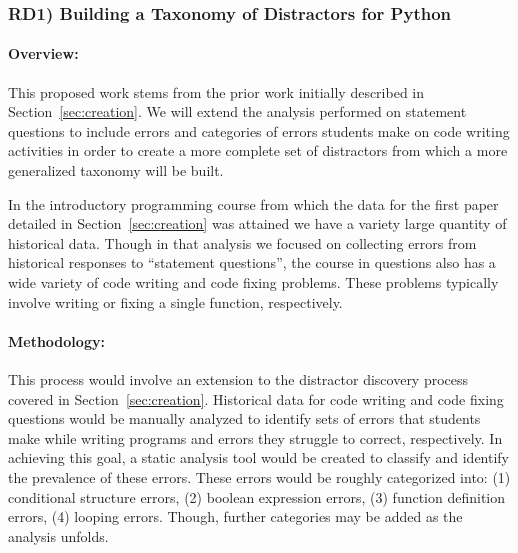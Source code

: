 \documentclass[authorversion,nonacm]{acmart}
\begin{document}
\subsubsection{RD1) Building a Taxonomy of Distractors for Python}\label{sec:taxonomy}

\paragraph{Overview:} 

This proposed work stems from the prior work initially described in
Section~\ref{sec:creation}. We will extend the analysis performed on statement
questions to include errors and categories of errors students make on code
writing activities in order to create a more complete set of distractors from
which a more generalized taxonomy will be built.  

In the introductory programming course from which the data for the first paper
detailed in Section~\ref{sec:creation} was attained we have a variety large
quantity of historical data. Though in that analysis we focused on collecting
errors from historical responses to ``statement questions'', the course in
questions also has a wide variety of code writing and code fixing problems.
These problems typically involve writing or fixing a single function,
respectively. 

\paragraph{Methodology:} This process would involve an extension to the
distractor discovery process covered in Section~\ref{sec:creation}. Historical
data for code writing and code fixing questions would be manually analyzed to
identify sets of errors that students make while writing programs and errors
they struggle to correct, respectively. In achieving this goal, a static 
analysis tool would be created to classify and identify the prevalence of 
these errors. These errors would be roughly categorized into: (1) conditional
structure errors, (2) boolean expression errors, (3) function definition
errors, (4) looping errors. Though, further categories may be added as 
the analysis unfolds. 
\end{document}
